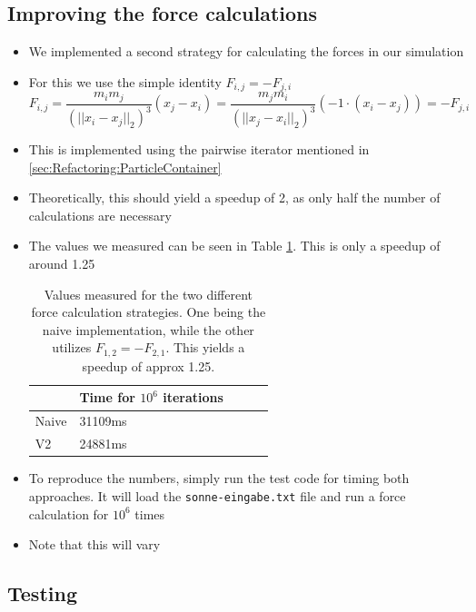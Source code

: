 \documentclass{article}
\begin{document}
\subsection{Improving the force calculations}
\label{sec:Refactoring:forceimprovements}

\begin{itemize}
    \item We implemented a second strategy for calculating the forces in our simulation
    \item For this we use the simple identity $F_{i,j} = -F_{j,i}$
        \begin{equation}
            F_{i,j} = \frac{m_im_j}{(||x_i-x_j||_2)^3} (x_j - x_i) = \frac{m_jm_i}{(||x_j-x_i||_2)^3} \left(-1 \cdot \left(x_i - x_j\right)\right) = - F_{j,i} 
        \end{equation}
    \item This is implemented using the pairwise iterator mentioned in \ref{sec:Refactoring:ParticleContainer}
    \item Theoretically, this should yield a speedup of 2, as only half the number of calculations are necessary
    \item The values we measured can be seen in Table \ref{tab:speedup}. This is only a speedup of around 1.25
        \begin{table}[H]
            \centering
            \begin{tabular}{|l|l|l|l|l|}
            \hline
                & Time for $10^6$ iterations \\ \hline
            Naive & 31109ms                  \\ \hline
            V2    & 24881ms                  \\ \hline
            \end{tabular}
            \caption{Values measured for the two different force calculation strategies. One being the naive implementation, while the other utilizes $F_{1,2} = - F_{2,1}$. This yields a speedup of approx 1.25.}
            \label{tab:speedup}
        \end{table}
    \item To reproduce the numbers, simply run the test code for timing both approaches. It will load the \verb|sonne-eingabe.txt| file and run a force calculation for $10^6$ times
    \item Note that this will vary
\end{itemize}

\subsection{Testing}
\end{document}
